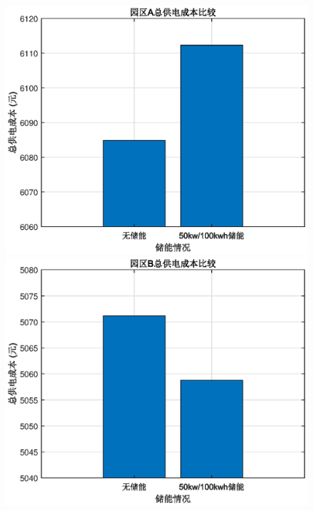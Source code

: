 \documentclass{cumcmthesis}
\begin{document}
\begin{figure}[!h]  
\centering  
\begin{minipage}{.5\textwidth}  
  \centering  
  \includegraphics[width=.9\linewidth]{figures/1_2_A2比较.eps}  
\end{minipage}%
\begin{minipage}{.5\textwidth}  
  \centering  
  \includegraphics[width=.9\linewidth]{figures/1_2_B2比较.eps}  
\end{minipage}  
\begin{minipage}{.5\textwidth}  
  \centering  

\end{minipage}
\end{figure}
\end{document}
